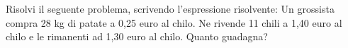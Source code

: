 \item Risolvi il seguente problema, scrivendo l'espressione risolvente: Un grossista compra 28 kg di patate a 0,25 euro al chilo. Ne rivende 11 chili a 1,40 euro al chilo e le rimanenti ad 1,30 euro al chilo. Quanto guadagna?